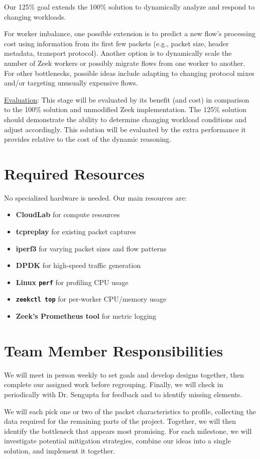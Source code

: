 \documentclass[sigconf, 10pt, nonacm]{acmart}
\begin{document}
Our 125\% goal extends the 100\% solution to dynamically analyze and respond
to changing workloads.

For worker imbalance, one possible extension is to predict a new flow’s processing cost using 
information from its first few packets (e.g., packet size, header metadata,
transport protocol). Another option is to dynamically scale the number of
Zeek workers or possibly migrate flows from one worker to another. For 
other bottlenecks, possible ideas include adapting to changing protocol 
mixes and/or targeting unusually expensive flows.

\underline{Evaluation}: This stage will be evaluated by its benefit (and cost) 
in comparison to the 100\% solution and unmodified Zeek
implementation. The 125\% solution should demonstrate the ability to determine
changing workload conditions and adjust accordingly. This solution will be
evaluated by the extra performance it provides relative to the cost of the
dynamic reasoning.

\section{Required Resources}

No specialized hardware is needed. Our main resources are:
\begin{itemize}
    \item \textbf{CloudLab} for compute resources
    \item \textbf{tcpreplay} for existing packet captures
    \item \textbf{iperf3} for varying packet sizes and flow patterns
    \item \textbf{DPDK} for high-speed traffic generation
    \item \textbf{Linux \texttt{perf}} for profiling CPU usage
    \item \textbf{\texttt{zeekctl top}} for per-worker CPU/memory usage
    \item\textbf{Zeek's Prometheus tool} for metric logging
\end{itemize}

\section{Team Member Responsibilities}

We will meet in person weekly to set goals and develop designs together, then
complete our assigned work before regrouping. Finally, we will check in periodically with Dr. Sengupta for feedback and to identify missing elements.

We will each pick one or two of the packet characteristics to 
profile, collecting the data required for the remaining parts of the project. 
Together, we will then identify the bottleneck that appears most promising. For 
each milestone, we will investigate potential mitigation 
strategies, combine our ideas into a single solution, and implement 
it together.




\end{document}

